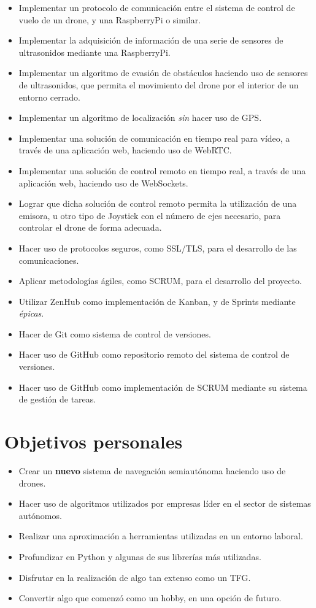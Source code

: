 \begin{itemize}
\item Implementar un protocolo de comunicación entre el sistema de control de vuelo de un drone, y una RaspberryPi o similar.
\item Implementar la adquisición de información de una serie de sensores de ultrasonidos mediante una RaspberryPi.
\item Implementar un algoritmo de evasión de obstáculos haciendo uso de sensores de ultrasonidos, que permita el movimiento del drone por el interior de un entorno cerrado.
\item Implementar un algoritmo de localización \emph{sin} hacer uso de GPS.
\item Implementar una solución de comunicación en tiempo real para vídeo, a través de una aplicación web, haciendo uso de WebRTC.
\item Implementar una solución de control remoto en tiempo real, a través de una aplicación web, haciendo uso de WebSockets.
\item Lograr que dicha solución de control remoto permita la utilización de una emisora, u otro tipo de Joystick con el número de ejes necesario, para controlar el drone de forma adecuada.
\item Hacer uso de protocolos seguros, como SSL/TLS, para el desarrollo de las comunicaciones.  
\item Aplicar metodologías ágiles, como SCRUM, para el desarrollo del proyecto.
\item Utilizar ZenHub como implementación de Kanban, y de Sprints mediante \textit{épicas}.
\item Hacer de Git como sistema de control de versiones.
\item Hacer uso de GitHub como repositorio remoto del sistema de control de versiones.
\item Hacer uso de GitHub como implementación de SCRUM mediante su sistema de gestión de tareas.
\end{itemize}


\section{Objetivos personales}

\begin{itemize}
\item Crear un \textbf{nuevo} sistema de navegación semiautónoma haciendo uso de drones.
\item Hacer uso de algoritmos utilizados por empresas líder en el sector de sistemas autónomos.
\item Realizar una aproximación a herramientas utilizadas en un entorno laboral.
\item Profundizar en Python y algunas de sus librerías más utilizadas.
\item Disfrutar en la realización de algo tan extenso como un TFG.
\item Convertir algo que comenzó como un hobby, en una opción de futuro.
\end{itemize}